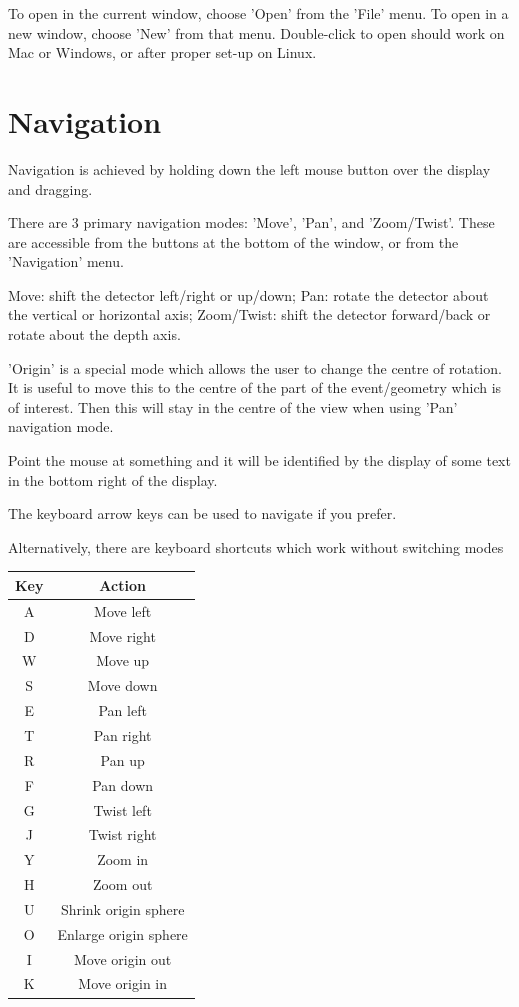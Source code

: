 \documentclass[12pt,a4]{article}
\begin{document}
To open in the current window, choose 'Open' from the 'File' menu.  To open in a new window, choose 'New' from that menu.
Double-click to open should work on Mac or Windows, or after proper set-up on Linux.

\section{Navigation}

Navigation is achieved by holding down the left mouse button over the display and dragging.

There are 3 primary navigation modes: 'Move', 'Pan', and 'Zoom/Twist'.
These are accessible from the buttons at the bottom of the window, or from the 'Navigation' menu.

Move: shift the detector left/right or up/down;
Pan: rotate the detector about the vertical or horizontal axis;
Zoom/Twist: shift the detector forward/back or rotate about the depth axis.

'Origin' is a special mode which allows the user to change the centre of rotation.  It is useful to move this to the centre of the part of the event/geometry which is of interest.  Then this will stay in the centre of the view when using 'Pan' navigation mode.

Point the mouse at something and it will be identified by the display of some text in the bottom right of the display.

The keyboard arrow keys can be used to navigate if you prefer.

Alternatively, there are keyboard shortcuts which work without switching modes

\vspace{0.5cm}
\begin{tabular}{|c|c|}
\hline
Key & Action \\
\hline
A & Move left \\
D & Move right \\
W & Move up \\
S & Move down \\
\hline
E & Pan left \\
T & Pan right \\
R & Pan up \\
F & Pan down \\
\hline
G & Twist left \\
J & Twist right \\
Y & Zoom in \\
H & Zoom out \\
\hline
U & Shrink origin sphere \\
O & Enlarge origin sphere \\
I & Move origin out \\
K & Move origin in \\
\hline
\end{tabular}
\vspace{0.5cm}
\end{document}

